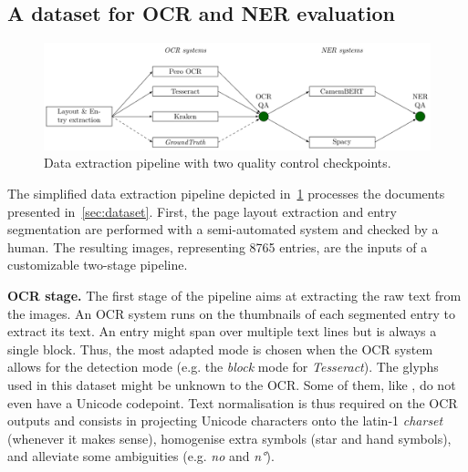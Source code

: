 \subsection{A dataset for OCR and NER evaluation}


\begin{figure}[tb]
    \includegraphics[width=\linewidth]{figs/protocol.pdf}
    \caption{Data extraction pipeline with two quality control checkpoints. }
    \label{fig.pipeline}
\end{figure}



The simplified data extraction pipeline depicted in~\cref{fig.pipeline} processes the documents presented
in~\cref{sec:dataset}. First, the page layout extraction and entry segmentation are performed with a
semi-automated system and checked by a human. The resulting images, representing 8765 entries, are the inputs of a customizable two-stage pipeline.

\textbf{OCR stage.} The first stage of the pipeline aims at extracting the raw text from the images. An OCR system runs
on the thumbnails of each segmented entry to extract its text. An entry might span over multiple text lines but is
always a single block. Thus, the most adapted mode is chosen when the OCR system allows for the detection mode (e.g. the
\emph{block} mode for \emph{Tesseract}). The glyphs used in this dataset might be unknown to the OCR. Some of them, like
, do not even have a Unicode codepoint. Text normalisation is thus required
on the OCR outputs and consists in projecting Unicode characters onto the latin-1 \emph{charset} (whenever it makes
sense), homogenise extra symbols (star and hand symbols), and alleviate some ambiguities (e.g. \emph{no} and \emph{n°}).

